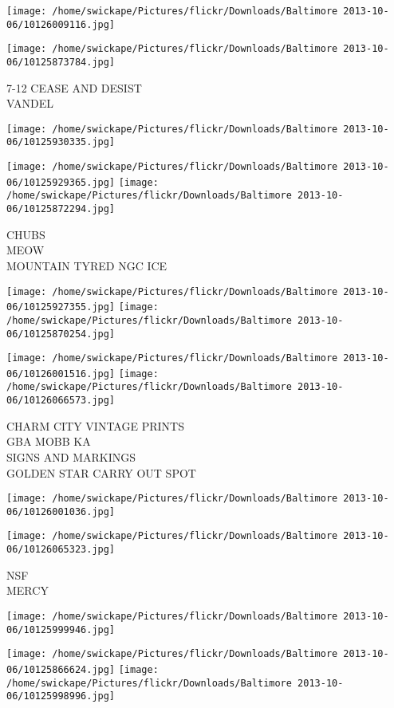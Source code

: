 \documentclass[10pt,letterpaper]{article}
\begin{document}
\texttt{[image: /home/swickape/Pictures/flickr/Downloads/Baltimore 2013-10-06/10126009116.jpg]}

\vspace{0.25in}
\texttt{[image: /home/swickape/Pictures/flickr/Downloads/Baltimore 2013-10-06/10125873784.jpg]}

7{-}12 CEASE AND DESIST\\
VANDEL
\pagebreak

\texttt{[image: /home/swickape/Pictures/flickr/Downloads/Baltimore 2013-10-06/10125930335.jpg]}

\vspace{0.25in}
\texttt{[image: /home/swickape/Pictures/flickr/Downloads/Baltimore 2013-10-06/10125929365.jpg]}
\texttt{[image: /home/swickape/Pictures/flickr/Downloads/Baltimore 2013-10-06/10125872294.jpg]}

CHUBS\\
MEOW\\
MOUNTAIN TYRED NGC ICE
\pagebreak

\texttt{[image: /home/swickape/Pictures/flickr/Downloads/Baltimore 2013-10-06/10125927355.jpg]}
\texttt{[image: /home/swickape/Pictures/flickr/Downloads/Baltimore 2013-10-06/10125870254.jpg]}

\texttt{[image: /home/swickape/Pictures/flickr/Downloads/Baltimore 2013-10-06/10126001516.jpg]}
\texttt{[image: /home/swickape/Pictures/flickr/Downloads/Baltimore 2013-10-06/10126066573.jpg]}

CHARM CITY VINTAGE PRINTS\\
GBA MOBB KA\\
SIGNS AND MARKINGS\\
GOLDEN STAR CARRY OUT SPOT
\pagebreak

\texttt{[image: /home/swickape/Pictures/flickr/Downloads/Baltimore 2013-10-06/10126001036.jpg]}

\vspace{0.25in}
\texttt{[image: /home/swickape/Pictures/flickr/Downloads/Baltimore 2013-10-06/10126065323.jpg]}

NSF\\
MERCY
\pagebreak

\texttt{[image: /home/swickape/Pictures/flickr/Downloads/Baltimore 2013-10-06/10125999946.jpg]}

\vspace{0.25in}
\texttt{[image: /home/swickape/Pictures/flickr/Downloads/Baltimore 2013-10-06/10125866624.jpg]}
\texttt{[image: /home/swickape/Pictures/flickr/Downloads/Baltimore 2013-10-06/10125998996.jpg]}
\end{document}

